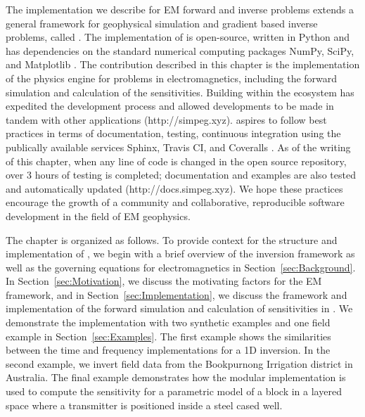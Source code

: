 The implementation we describe for EM forward and inverse problems extends a
general framework for geophysical simulation and gradient based inverse
problems, called \SimPEG \citep{Cockett2015}. The implementation of \SimPEG is
open-source, written in Python and has dependencies on the standard numerical
computing packages NumPy, SciPy, and Matplotlib \citep{numpy, scipy,
matplotlib}. The contribution described in this chapter is the implementation of
the physics engine for problems in electromagnetics, including the forward
simulation and calculation of the sensitivities. Building within the \SimPEG
ecosystem has expedited the development process and allowed developments to be
made in tandem with other applications (http://simpeg.xyz). \simpegEM aspires
to follow best practices in terms of documentation, testing, continuous
integration using the publically available services Sphinx, Travis CI, and
Coveralls \citep{Sphinx, Travis, Coveralls}. As of the writing of this chapter,
when any line of code is changed in the open source repository, over 3 hours
of testing is completed; documentation and examples are also tested and
automatically updated (http://docs.simpeg.xyz). We hope these practices
encourage the growth of a community and collaborative, reproducible software
development in the field of EM geophysics.

\bigskip

The chapter is organized as follows. To provide context for the structure and
implementation of \simpegEM, we begin with a brief overview of the \SimPEG
inversion framework as well as the governing equations for electromagnetics in
Section~\ref{sec:Background}. In Section~\ref{sec:Motivation}, we discuss the
motivating factors for the EM framework, and in
Section~\ref{sec:Implementation}, we discuss the framework and implementation
of the forward simulation and calculation of sensitivities in \simpegEM. We
demonstrate the implementation with two synthetic examples and one field
example in Section~\ref{sec:Examples}. The first example shows the
similarities between the time and frequency implementations for a 1D
inversion. In the second example, we invert field data from the Bookpurnong
Irrigation district in Australia. The final example demonstrates how the
modular implementation is used to compute the sensitivity for a parametric
model of a block in a layered space where a transmitter is positioned inside a
steel cased well.



